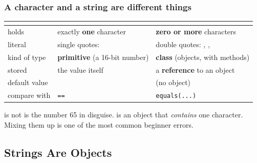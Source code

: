 \documentclass[aspectratio=169,10pt,compress]{beamer}
\begin{document}
\begin{frame}[t,fragile] \frametitle{A character and a string are different things}
  \small
  \begin{tabular}{@{}L{0.22\textwidth}L{0.33\textwidth}L{0.36\textwidth}@{}}
    \toprule
                       & \textbf{}                  & \textbf{} \\
    \midrule
    holds              & exactly \textbf{one} character           & \textbf{zero or more} characters \\
    literal            & single quotes:               & double quotes: , ,  \\
    kind of type       & \textbf{primitive} (a 16-bit number)     & \textbf{class} (objects, with methods) \\
    stored             & the value itself                          & a \textbf{reference} to an object \\
    default value      &           &  (no object) \\
    compare with       & \texttt{==}                               & \texttt{equals(...)} \\
    \bottomrule
  \end{tabular}

  \vspace{0.8em}
	\begin{alertblock}
		{ is not }
		 is the number 65 in disguise. 
		 is an object that \emph{contains} one character.
		Mixing them up is one of the most common beginner errors.
	\end{alertblock}
\end{frame}

\subsection[Objects]{Strings Are Objects}{}{}

\end{document}
